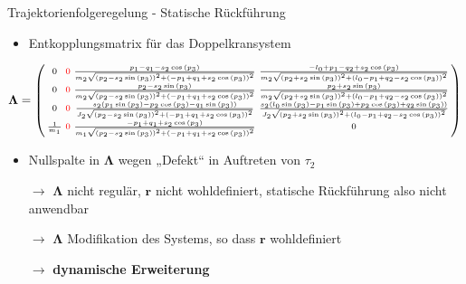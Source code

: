 \documentclass[
	ngerman,
	10pt,				%
	aspectratio=169, 	%
	xcolor=dvipsnames
]{beamer}
\begin{document}
\begin{frame}[t,fragile,label=trajektorienregelung_4]{\large Trajektorienfolgeregelung - Statische Rückführung}
	
	\begin{itemize}
		\item Entkopplungsmatrix für das Doppelkransystem
	\end{itemize}
	\begin{align*}
	\boldsymbol{\Lambda} = 
	\left(\begin{smallmatrix}
	0 & \textcolor{red}{0} & \frac{p_{1} - q_{1} - s_{2} \cos{\left(p_{3} \right)}}{m_{2} \sqrt{\left(p_{2} - 	s_{2} \sin{\left(p_{3} \right)}\right)^{2} + \left(- p_{1} + q_{1} + s_{2} \cos{\left(p_{3} \right)}\right)^{2}}} & \frac{- l_{0} + p_{1} - q_{2} + s_{2} \cos{\left(p_{3} \right)}}{m_{2} \sqrt{\left(p_{2} + s_{2} \sin{\left(p_{3} \right)}\right)^{2} + \left(l_{0} - p_{1} + q_{2} - s_{2} \cos{\left(p_{3} \right)}\right)^{2}}}\\
	0 & \textcolor{red}{0} & \frac{p_{2} - s_{2} \sin{\left(p_{3} \right)}}{m_{2} \sqrt{\left(p_{2} - s_{2} 	\sin{\left(p_{3} \right)}\right)^{2} + \left(- p_{1} + q_{1} + s_{2} \cos{\left(p_{3} \right)}\right)^{2}}} & \frac{p_{2} + s_{2} \sin{\left(p_{3} \right)}}{m_{2} \sqrt{\left(p_{2} + s_{2} \sin{\left(p_{3} \right)}\right)^{2} + \left(l_{0} - p_{1} + q_{2} - s_{2} \cos{\left(p_{3} \right)}\right)^{2}}}\\
	0 & \textcolor{red}{0} & \frac{s_{2} \left(p_{1} \sin{\left(p_{3} \right)} - p_{2} \cos{\left(p_{3} \right)} - 	q_{1} \sin{\left(p_{3} \right)}\right)}{J_{2} \sqrt{\left(p_{2} - s_{2} \sin{\left(p_{3} \right)}\right)^{2} + \left(- p_{1} + q_{1} + s_{2} \cos{\left(p_{3} \right)}\right)^{2}}} & \frac{s_{2} \left(l_{0} \sin{\left(p_{3} \right)} - p_{1} \sin{\left(p_{3} \right)} + p_{2} \cos{\left(p_{3} \right)} + q_{2} \sin{\left(p_{3} \right)}\right)}{J_{2} \sqrt{\left(p_{2} + s_{2} \sin{\left(p_{3} \right)}\right)^{2} + \left(l_{0} - p_{1} + q_{2} - s_{2} \cos{\left(p_{3} \right)}\right)^{2}}}\\
	\frac{1}{m_{1}} & \textcolor{red}{0} & \frac{- p_{1} + q_{1} + s_{2} \cos{\left(p_{3} \right)}}{m_{1} 	\sqrt{\left(p_{2} - s_{2} \sin{\left(p_{3} \right)}\right)^{2} + \left(- p_{1} + q_{1} + s_{2} \cos{\left(p_{3} \right)}\right)^{2}}} & 0
	\end{smallmatrix}\right)
	\end{align*}
	\pause
	\begin{itemize}
		\item Nullspalte in $\boldsymbol{\Lambda}$ wegen „Defekt“ in Auftreten von $\tau_2$
		\item[$\rightarrow$] $\boldsymbol{\Lambda}$ nicht regulär, $\mathbf{r}$ nicht wohldefiniert, statische Rückführung also nicht anwendbar
		\pause
		\item[$\rightarrow$] $\boldsymbol{\Lambda}$ Modifikation des Systems, so dass $\mathbf{r}$ wohldefiniert
		\pause
		\item[$\rightarrow$] \textbf{dynamische Erweiterung}
	\end{itemize}
	

\end{frame}
\end{document}
